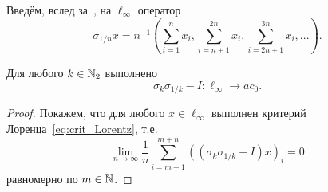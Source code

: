 Введём, вслед за~\cite[с. 131, утверждение 2.b.2]{lindenstrauss1979classical},
на $\ell_\infty$ оператор
\begin{equation}
	\sigma_{1/n} x = n^{-1}
	\left(
		\sum_{i=1}^{n} x_i,
		\sum_{i=n+1}^{2n} x_i,
		\sum_{i=2n+1}^{3n} x_i,
		...
	\right).
\end{equation}

\begin{lemma}
	Для любого $k\in\mathbb{N}_2$ выполнено
	\begin{equation}
		\sigma_k \sigma_{1/k} - I : \ell_\infty \to ac_0
		.
	\end{equation}
\end{lemma}

\begin{proof}
	Покажем, что для любого $x\in\ell_\infty$ выполнен критерий Лоренца~\eqref{eq:crit_Lorentz},
	т.е.
	\begin{equation}
		\label{eq:Lorentz_sigma_1_k_I}
		\lim_{n\to\infty} \frac{1}{n} \sum_{i=m+1}^{m+n} ((\sigma_k \sigma_{1/k} - I)x)_i = 0
	\end{equation}
	равномерно по $m\in\mathbb{N}$.


\end{proof}
